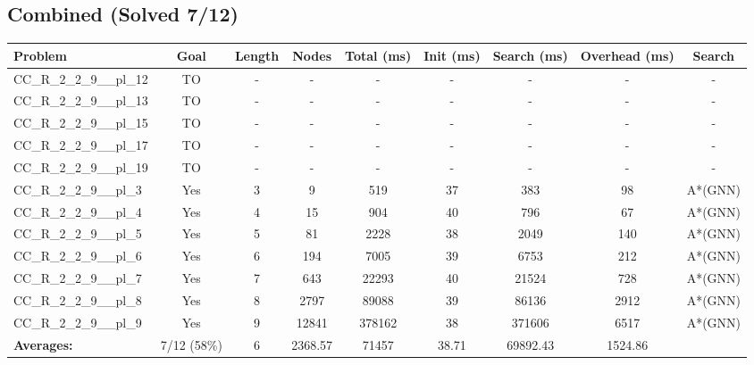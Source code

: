 \documentclass{article}
\begin{document}
\subsection*{Combined (Solved 7/12)}
\begin{tabular}{lcccccccc}
\toprule
Problem & Goal & Length & Nodes & Total (ms) & Init (ms) & Search (ms) & Overhead (ms) & Search \\
\midrule
CC\_R\_2\_2\_9\_\_pl\_12 & TO & - & - & - & - & - & - & - \\
CC\_R\_2\_2\_9\_\_pl\_13 & TO & - & - & - & - & - & - & - \\
CC\_R\_2\_2\_9\_\_pl\_15 & TO & - & - & - & - & - & - & - \\
CC\_R\_2\_2\_9\_\_pl\_17 & TO & - & - & - & - & - & - & - \\
CC\_R\_2\_2\_9\_\_pl\_19 & TO & - & - & - & - & - & - & - \\
CC\_R\_2\_2\_9\_\_pl\_3 & Yes & 3 & 9 & 519 & 37 & 383 & 98 & A*(GNN) \\
CC\_R\_2\_2\_9\_\_pl\_4 & Yes & 4 & 15 & 904 & 40 & 796 & 67 & A*(GNN) \\
CC\_R\_2\_2\_9\_\_pl\_5 & Yes & 5 & 81 & 2228 & 38 & 2049 & 140 & A*(GNN) \\
CC\_R\_2\_2\_9\_\_pl\_6 & Yes & 6 & 194 & 7005 & 39 & 6753 & 212 & A*(GNN) \\
CC\_R\_2\_2\_9\_\_pl\_7 & Yes & 7 & 643 & 22293 & 40 & 21524 & 728 & A*(GNN) \\
CC\_R\_2\_2\_9\_\_pl\_8 & Yes & 8 & 2797 & 89088 & 39 & 86136 & 2912 & A*(GNN) \\
CC\_R\_2\_2\_9\_\_pl\_9 & Yes & 9 & 12841 & 378162 & 38 & 371606 & 6517 & A*(GNN) \\
\textbf{Averages:} & 7/12 (58\%) & 6 & 2368.57 & 71457 & 38.71 & 69892.43 & 1524.86 & \\
\bottomrule
\end{tabular}
\\[0.7cm]
\end{document}
